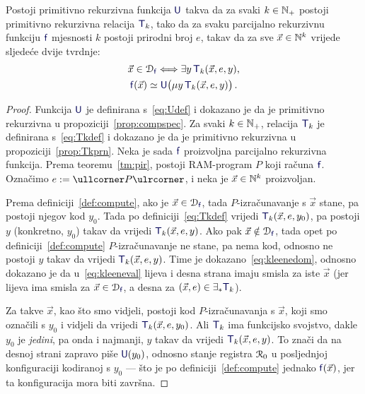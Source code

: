 \begin{teorem}\label{tm:Kleene}
Postoji primitivno rekurzivna funkcija $\f U$ takva da za svaki $k\in{\mathbb N}_+$ postoji primitivno rekurzivna relacija $\f T_k$, tako da za svaku parcijalno rekurzivnu funkciju $\f f$ mjesnosti $k$ postoji prirodni broj $e$, takav da za sve $\vec x\in{\mathbb N}^k$ vrijede sljedeće dvije tvrdnje:
\begin{gather}
    \label{eq:kleenedom}\vec x\in\dom{\f f}\Longleftrightarrow\exists y\,\f T_k(\vec x,e,y)\text,\\
    \label{eq:kleeneval}\f f(\vec x)\simeq\f U\bigl(\mu y\,\f T_k(\vec x,e,y)\bigr)\,\text.
\end{gather}
\end{teorem}
\begin{proof}
	Funkcija $\f U$ je definirana s~\eqref{eq:Udef} i dokazano je da je primitivno rekurzivna u propoziciji~\ref{prop:compspec}. Za svaki $k\in{\mathbb N}_+$, relacija $\f T_k$ je definirana s~\eqref{eq:Tkdef} i dokazano je da je primitivno rekurzivna u propoziciji~\ref{prop:Tkprn}. Neka je sada $\f f$ proizvoljna parcijalno rekurzivna funkcija. Prema teoremu~\ref{tm:pir}, postoji RAM-program $P$ koji računa $\f f$. Označimo $e:=\kprog P$, i neka je $\vec x\in{\mathbb N}^k$ proizvoljan.

Prema definiciji~\ref{def:compute}, ako je $\vec x\in\dom{\f f}$, tada $P$-izračunavanje s $\vec x$ stane, pa postoji njegov kod $y_0$. Tada po definiciji~\eqref{eq:Tkdef} vrijedi $\f T_k(\vec x,e,y_0)$, pa postoji $y$ (konkretno, $y_0$) takav da vrijedi $\f T_k(\vec x,e,y)$. Ako pak $\vec x\notin\dom{\f f}$, tada opet po definiciji~\ref{def:compute} $P$-izračunavanje ne stane, pa nema kod, odnosno ne postoji $y$ takav da vrijedi $\f T_k(\vec x,e,y)$. Time je dokazano~\eqref{eq:kleenedom}, odnosno dokazano je da u~\eqref{eq:kleeneval} lijeva i desna strana imaju smisla za iste $\vec x$ (jer lijeva ima smisla za $\vec x\in\dom{\f f}$, a desna za $(\vec x,e)\in\exists_*\f T_k$).

Za takve $\vec x$, kao što smo vidjeli, postoji kod $P$-izračunavanja s $\vec x$, koji smo označili s $y_0$ i vidjeli da vrijedi $\f T_k(\vec x,e,y_0)$. Ali $\f T_k$ ima funkcijsko svojstvo, dakle $y_0$ je \emph{jedini}, pa onda i najmanji, $y$ takav da vrijedi $\f T_k(\vec x,e,y)$. To znači da na desnoj strani zapravo piše $\f U(y_0)$, odnosno stanje registra $\mathcal R_{0}$ u posljednjoj konfiguraciji kodiranoj s $y_0$ --- što je po definiciji~\ref{def:compute} jednako $\f f(\vec x)$, jer ta konfiguracija mora biti završna.
\end{proof}

